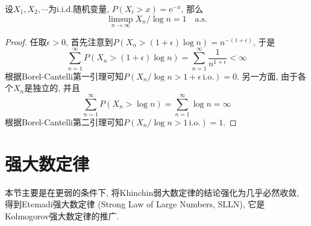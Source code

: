 \documentclass[cn, 12pt, math=mtpro2, bibstyle=apa, blue, twocol]{elegantbook}
\begin{document}
\begin{example}
设$X_1,X_2,\cdots$为i.i.d.随机变量, $P(X_i>x)=\text{e}^{-x}$, 那么
$$\limsup_{n\to\infty} X_n/\log n=1\quad \text{a.s.}$$
\end{example}
\begin{proof}
  任取$\epsilon>0$, 首先注意到$P(X_n>(1+\epsilon)\log n)=n^{-(1+\epsilon)}$, 于是
  $$\sum_{n=1}^{\infty}P\left(X_n>(1+\epsilon)\log n\right)=\sum_{n=1}^{\infty}\frac{1}{n^{1+\epsilon}}<\infty$$
  根据Borel-Cantelli第一引理可知$P(X_n/\log n>1+\epsilon\,\text{i.o.})=0$.
  另一方面, 由于各个$X_n$是独立的, 并且
  $$\sum_{n=1}^{\infty}P(X_n>\log n)=\sum_{n=1}^{\infty}\log n=\infty$$
  根据Borel-Cantelli第二引理可知$P(X_n/\log n>1\,\text{i.o.})=1$.

\end{proof}
\section{强大数定律}
本节主要是在更弱的条件下, 将Khinchin弱大数定律的结论强化为几乎必然收敛, 得到Etemadi强大数定律 (Strong Law of Large Numbers, SLLN), 它是Kolmogorov强大数定律的推广.
\end{document}
